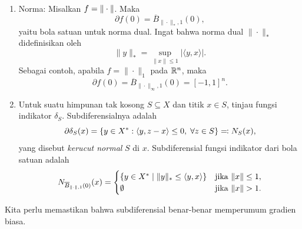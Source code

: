 \Needspace{0.62\textheight}
\begin{example}\
    \begin{enumerate}
        \item Norma: Misalkan $f = \|\cdot\|$. Maka
			\[
				\partial f(0) = \overline{B}_{\|\cdot\|_*, 1}(0),
			\]
            yaitu bola satuan untuk norma dual. Ingat bahwa norma dual $\|\cdot\|_*$ didefinisikan oleh
            \[
                \|y\|_* = \sup_{\|x\|\leq 1} |\langle y,x\rangle|.
            \]
			Sebagai contoh, apabila $f = \|\cdot\|_1$ pada $\mathbb{R}^n$, maka
			\[
				\partial f(0) = \overline{B}_{\|\cdot\|_\infty,1}(0) = [-1,1]^n.
			\]
        \item Untuk suatu himpunan tak kosong $S \subseteq X$ dan titik $x \in S$, tinjau fungsi indikator $\delta_S$. Subdiferensialnya adalah
			\[
				\partial\delta_S(x)=\left\{y\in X^\ast:\left\langle y , z-x\right\rangle\leq 0,\;\forall z\in S\right\}\eqqcolon N_S(x),
			\]
			yang disebut \emph{kerucut normal} $S$ di $x$.
			Subdiferensial fungsi indikator dari bola satuan adalah
			\[
				N_{\overline{B}_{\|\cdot\|, 1}(0)}(x)=
				\begin{cases}
					\{y\in X^\ast\mid\|y\|_*\leq \inner{y}{x}\}&\text{jika }\norm{x}\leq 1,\\
					\emptyset&\text{jika }\norm{x}>1.
				\end{cases}
            \]
    \end{enumerate}
\end{example}

Kita perlu memastikan bahwa subdiferensial benar-benar memperumum gradien biasa.

